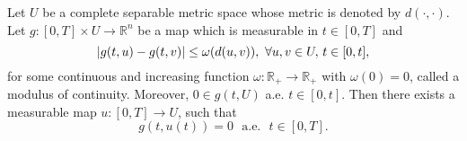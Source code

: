     \begin{lemma}\label{FL}
        Let $U$ be a complete separable metric space whose metric is denoted by 
        $d(\cdot,\cdot)$. Let $g:[0,T]\times U\to \mathbb{R}^n$ be a map which is 
        measurable in $t\in[0,T]$ and
    	\begin{equation*}
    	    \left\lvert g(t,u)-g(t,v)\right\rvert \leq \omega(d(u,v)), \,\, \forall u,v\in U, \, t\in [0,t],
    	\end{equation*}
        for some continuous and increasing function $\omega:\mathbb{R}_{+}\to \mathbb{R}_{+}$ 
        with $\omega(0)=0$, called a modulus of continuity. Moreover, $0\in g(t,U)$ a.e. 
        $t\in [0,t]$.
    	Then there exists a measurable map $u:[0,T] \to U$, such that 
    	\begin{equation}\label{eq1.17}
    	    g(t,u(t)) = 0 \,\, \mbox{ a.e. } \,\, t\in [0,T].
    	\end{equation}
    \end{lemma}
